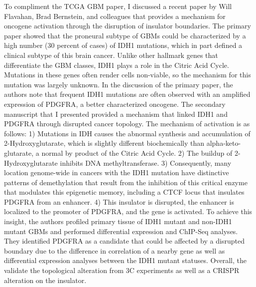 \documentclass[12pt]{article}
\begin{document}
\begin{addmargin}[6.5mm]{4mm}  
To compliment the TCGA GBM paper, I discussed a recent paper by Will Flavahan, Brad Bernstein, and colleagues that provides a mechanism for oncogene activation through the disruption of insulator boundaries. The primary paper showed that the proneural subtype of GBMs could be characterized by a high number (30 percent of cases) of IDH1 mutations, which in part defined a clinical subtype of this brain cancer. Unlike other hallmark genes that differentiate the GBM classes, IDH1 plays a role in the Citric Acid Cycle. Mutations in these genes often render cells non-viable, so the mechanism for this mutation was largely unknown. In the discussion of the primary paper, the authors note that frequent IDH1 mutations are often observed with an amplified expression of PDGFRA, a better characterized oncogene. The secondary manuscript that I presented provided a mechanism that linked IDH1 and PDGFRA through disrupted cancer topology.  \newline \newline The mechanism of activation is as follows: 1) Mutations in IDH causes the abnormal synthesis and accumulation of 2-Hydroxyglutarate, which is slightly different biochemically than alpha-keto-glutarate, a normal by product of the Citric Acid Cycle. 2) The buildup of 2-Hydroxyglutarate inhibits DNA methyltransferase. 3) Consequently, many location genome-wide in cancers with the IDH1 mutation have distinctive patterns of demethylation that result from the inhibition of this critical enzyme that modulates this epigenetic memory, including a CTCF locus that insulates PDGFRA from an enhancer. 4) This insulator is disrupted, the enhancer is localized to the promoter of PDGFRA, and the gene is activated. \newline \newline To achieve this insight, the authors profiled primary tissue of IDH1 mutant and non-IDH1 mutant GBMs and performed differential expression and ChIP-Seq analyses. They identified PDGFRA as a candidate that could be affected by a disrupted boundary due to the difference in correlation of a nearby gene as well as differential expression analyses between the IDH1 mutant statuses. Overall, the validate the topological alteration from 3C experiments as well as a CRISPR alteration on the insulator. \newline \newline 

\end{addmargin}
\end{document}
